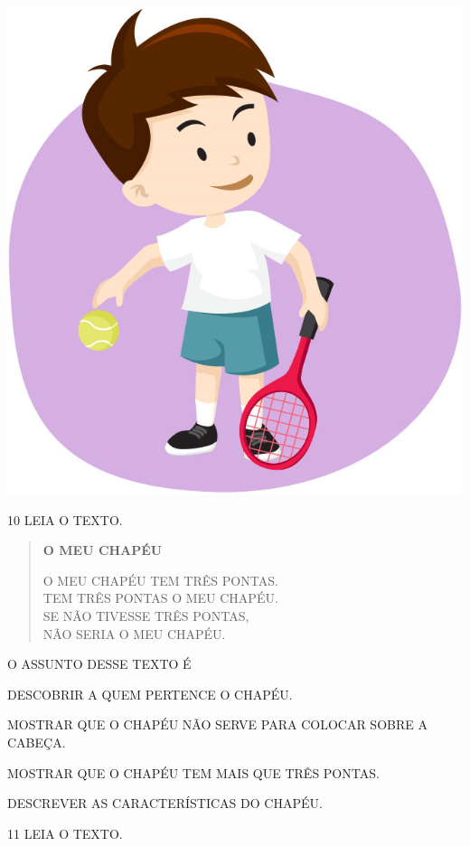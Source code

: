 \begin{multicols}{2}
\begin{escolha}
\item \includegraphics[width=.5\textwidth]{media/image258d.png}
\end{escolha}
\end{multicols}

\pagebreak

\num{10} LEIA O TEXTO.

\begin{myquote}
\begin{verse}
\textbf{O MEU CHAPÉU}

O MEU CHAPÉU TEM TRÊS PONTAS.\\
TEM TRÊS PONTAS O MEU CHAPÉU.\\
SE NÃO TIVESSE TRÊS PONTAS,\\
NÃO SERIA O MEU CHAPÉU.
\end{verse}

\end{myquote}

O ASSUNTO DESSE TEXTO É

\begin{escolha}[itemsep=-5pt]
\item DESCOBRIR A QUEM PERTENCE O CHAPÉU.

\item MOSTRAR QUE O CHAPÉU NÃO SERVE PARA COLOCAR SOBRE A CABEÇA.

\item MOSTRAR QUE O CHAPÉU TEM MAIS QUE TRÊS PONTAS.

\item DESCREVER AS CARACTERÍSTICAS DO CHAPÉU.
\end{escolha}


\num{11} LEIA O TEXTO.

